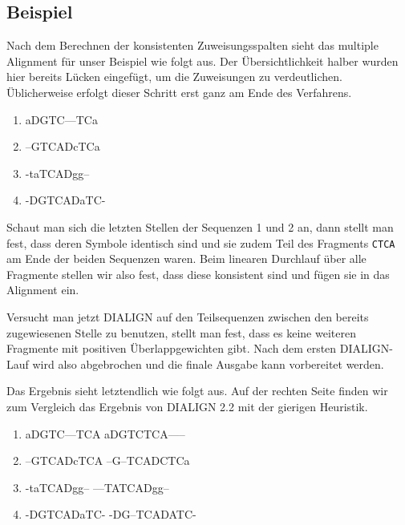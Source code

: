 \subsection{Beispiel}

Nach dem Berechnen der konsistenten Zuweisungsspalten sieht das multiple Alignment für unser Beispiel wie folgt aus. Der Übersichtlichkeit halber wurden hier bereits Lücken eingefügt, um die Zuweisungen zu verdeutlichen. Üblicherweise erfolgt dieser Schritt erst ganz am Ende des Verfahrens.

\ttfamily
\begin{enumerate}[topsep=0pt,itemsep=-1ex,partopsep=1ex,parsep=1ex]
	\item aDGTC---TCa
	\item --GTCADcTCa
	\item -taTCADgg--
	\item -DGTCADaTC-
\end{enumerate}
\normalfont

Schaut man sich die letzten Stellen der Sequenzen 1 und 2 an, dann stellt man fest, dass deren Symbole identisch sind und sie zudem Teil des Fragments \texttt{CTCA} am Ende der beiden Sequenzen waren. Beim linearen Durchlauf über alle Fragmente stellen wir also fest, dass diese konsistent sind und fügen sie in das Alignment ein.

Versucht man jetzt DIALIGN auf den Teilsequenzen zwischen den bereits zugewiesenen Stelle zu benutzen, stellt man fest, dass es keine weiteren Fragmente mit positiven Überlappgewichten gibt. Nach dem ersten DIALIGN-Lauf wird also abgebrochen und die finale Ausgabe kann vorbereitet werden.

Das Ergebnis sieht letztendlich wie folgt aus. Auf der rechten Seite finden wir zum Vergleich das Ergebnis von DIALIGN 2.2 mit der gierigen Heuristik.

\ttfamily
\begin{enumerate}[topsep=0pt,itemsep=-1ex,partopsep=1ex,parsep=1ex]
	\item aDGTC---TCA \hspace{3cm} aDGTCTCA-----
	\item --GTCADcTCA \hspace{3cm} --G--TCADCTCa
	\item -taTCADgg-- \hspace{3cm} ---TATCADgg--
	\item -DGTCADaTC- \hspace{3cm} -DG--TCADATC-
\end{enumerate}
\normalfont

